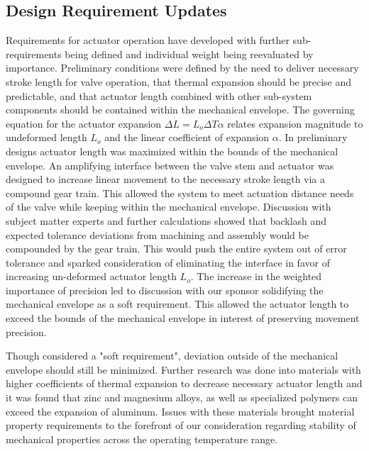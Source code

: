 \documentclass[12pt, letterpaper]{report}%
\newcounter{mycounter}           %
\newcounter{sub}[mycounter]      %
\begin{document}
        \subsection{Design Requirement Updates}
        \label{subsec:act_req_updates}

         Requirements for actuator operation have developed with further sub-requirements being 
        defined and individual weight being reevaluated by importance. Preliminary 
        conditions were defined by the need to deliver necessary stroke length for valve operation, 
        that thermal expansion
        should be precise and predictable, and that actuator length combined with other sub-system
        components should be contained within the mechanical envelope. The governing equation for
        the actuator expansion $\Delta L = L_o\Delta T\alpha $ relates expansion magnitude to 
        undeformed length $L_o$ and the linear coefficient of expansion $\alpha$. In preliminary 
        designs actuator length was maximized within the bounds of the mechanical envelope. 
        An amplifying interface between the valve stem and actuator was designed to increase 
        linear movement to the necessary stroke length via a compound gear train. This allowed the
        system to meet actuation distance needs of the valve while keeping within the mechanical 
        envelope. Discussion with subject matter experts and further calculations 
        showed that backlash and expected tolerance deviations from machining and assembly would
        be compounded by the gear train. 
        This would push the entire system out of error tolerance and 
        sparked consideration of eliminating the interface in favor of increasing un-deformed actuator
        length $L_o$. The increase in the weighted importance of precision led to discussion with
        our sponsor solidifying the mechanical envelope as a soft requirement. This allowed the actuator
        length to exceed the bounds of the mechanical envelope in interest of preserving movement precision.

        Though considered a "soft requirement", deviation outside of the mechanical envelope should still 
        be minimized. Further research was done into materials with higher coefficients of thermal 
        expansion to decrease necessary actuator length and it was found that zinc and magnesium alloys,
        as well as specialized polymers can exceed the expansion of aluminum. 
        Issues with these materials brought material property requirements
        to the forefront of our consideration regarding stability of mechanical properties across the operating temperature
        range. 
\end{document}
